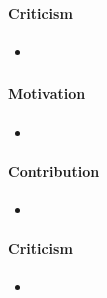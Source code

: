 \documentclass[12pt]{article}	%
\begin{document}
\paragraph{Criticism}
\begin{itemize}
	\item
\end{itemize}


\subsubsection*{}
\paragraph{Motivation}
\begin{itemize}
	\item
\end{itemize}
\paragraph{Contribution}
\begin{itemize}
	\item
\end{itemize}
\paragraph{Criticism}
\begin{itemize}
	\item
\end{itemize}


\cite{Kohlbecker1986Hygienic,Kohlbecker1987Macrobyexample,Bawden1988Syntactic,Clinger1991Macros,Dybvig1992Syntactic,Dybvig1992Writing,Flatt2002Composable,Culpepper2004Taming,Herman2008Theory,Culpepper2010Fortifying}


\end{document}
